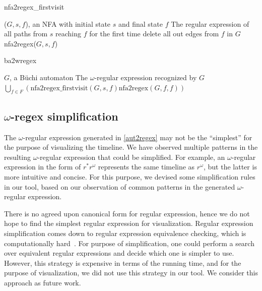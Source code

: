 \documentclass[conference]{IEEEtran}
\theoremstyle{definition}
\theoremstyle{remark}
\newcommand{\Buchi}{B\"{u}chi }
\begin{document}
\begin{algorithm}[h!]
    \caption{nfa2regex\_firstvisit}
    \begin{algorithmic}
        \Require ($G, s, f$), an NFA with initial state $s$ and final state $f$
        \Ensure The regular expression of all paths from $s$ reaching $f$ for the first time
        \State delete all out edges from $f$ in $G$
        \State \Return nfa2regex($G, s, f$)
    \end{algorithmic}
\end{algorithm}

\begin{algorithm}[h!]
    \label{alg:ba2wregex}
    \caption{ba2wregex}
    \begin{algorithmic}
        \Require $G$, a \Buchi automaton
        \Ensure The $\omega$-regular expression recognized by $G$
        \State \Return $\bigcup_{f \in F}\left(\text{nfa2regex\_firstvisit}(G, s, f)\text{nfa2regex}(G, f, f) \right) $
    \end{algorithmic}
\end{algorithm}

\subsection{$\omega$-regex simplification} \label{regex-simplify}

The $\omega$-regular expression generated in \cref{aut2regex} may not be the ``simplest'' for the purpose of visualizing the timeline. We have observed multiple patterns in the resulting $\omega$-regular expression that could be simplified. For example, an $\omega$-regular expression in the form of $r^*r^{\omega}$ represents the same timeline as $r^{\omega}$, but the latter is more intuitive and concise. For this purpose, we devised some simplification rules in our tool, based on our observation of common patterns in the generated $\omega$-regular expression.

There is no agreed upon canonical form for regular expression, hence we do not hope to find the simplest regular expression for visualization. Regular expression simplification comes down to regular expression equivalence checking, which is computationally hard~\cite{MNS04}. For purpose of simplification, one could perform a search over equivalent regular expressions and decide which one is simpler to use. However, this strategy is expensive in terms of the running time, and for the purpose of visualization, we did not use this strategy in our tool. We consider this approach as future work.
\end{document}
